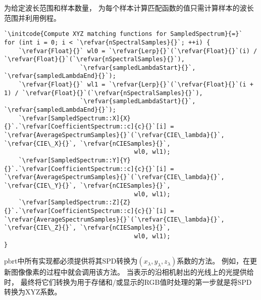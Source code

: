 为给定波长范围和样本数量，
为每个样本计算匹配函数的值只需计算样本的波长范围并利用例程。
\begin{lstlisting}
`\initcode{Compute XYZ matching functions for SampledSpectrum}{=}`
for (int i = 0; i < `\refvar{nSpectralSamples}{}`; ++i) {
    `\refvar{Float}{}` wl0 = `\refvar{Lerp}{}`(`\refvar{Float}{}`(i) / `\refvar{Float}{}`(`\refvar{nSpectralSamples}{}`),
                     `\refvar{sampledLambdaStart}{}`, `\refvar{sampledLambdaEnd}{}`);
    `\refvar{Float}{}` wl1 = `\refvar{Lerp}{}`(`\refvar{Float}{}`(i + 1) / `\refvar{Float}{}`(`\refvar{nSpectralSamples}{}`),
                     `\refvar{sampledLambdaStart}{}`, `\refvar{sampledLambdaEnd}{}`);
    `\refvar[SampledSpectrum::X]{X}{}`.`\refvar[CoefficientSpectrum::c]{c}{}`[i] = `\refvar{AverageSpectrumSamples}{}`(`\refvar{CIE\_lambda}{}`, `\refvar{CIE\_X}{}`, `\refvar{nCIESamples}{}`,
                                    wl0, wl1);
    `\refvar[SampledSpectrum::Y]{Y}{}`.`\refvar[CoefficientSpectrum::c]{c}{}`[i] = `\refvar{AverageSpectrumSamples}{}`(`\refvar{CIE\_lambda}{}`, `\refvar{CIE\_Y}{}`, `\refvar{nCIESamples}{}`,
                                    wl0, wl1);
    `\refvar[SampledSpectrum::Z]{Z}{}`.`\refvar[CoefficientSpectrum::c]{c}{}`[i] = `\refvar{AverageSpectrumSamples}{}`(`\refvar{CIE\_lambda}{}`, `\refvar{CIE\_Z}{}`, `\refvar{nCIESamples}{}`,
                                    wl0, wl1);
}
\end{lstlisting}

pbrt中所有实现都必须提供将其SPD转换为$(x_{\lambda},y_{\lambda},z_{\lambda})$系数的方法。
例如，在更新图像像素的过程中就会调用该方法。
当表示的沿相机射出的光线上的光提供给时，
最终将它们转换为用于存储和/或显示的RGB值时处理的第一步就是将SPD转换为XYZ系数。

